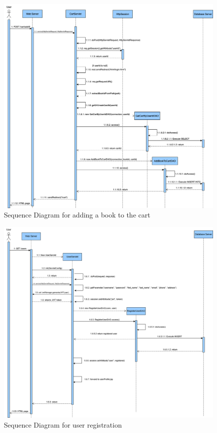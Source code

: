\clearpage
\begin{figure}[h!]
    \centering
    \includegraphics[width=\textwidth]{photos/SequenceDiagram_CartServlet_AddBookToCart.png}
    \caption{Sequence Diagram for adding a book to the cart}
    \label{fig:addtocartsequencediagram}
\end{figure}

\clearpage
\begin{figure}[h!]
    \centering
    \includegraphics[width=\textwidth]{photos/registeruser-sequence-diagram.png}
    \caption{Sequence Diagram for user registration}
    \label{fig:registerusersequencediagram}
\end{figure}

